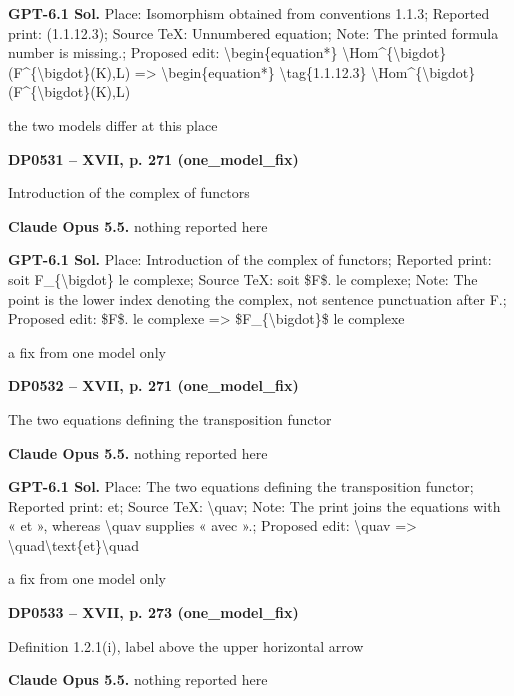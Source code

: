 \textbf{GPT-6.1 Sol.} Place: Isomorphism obtained from conventions 1.1.3; Reported print: (1.1.12.3); Source TeX: Unnumbered equation; Note: The printed formula number is missing.; Proposed edit: \textbackslash{}begin\{equation*\} \textbackslash{}Hom\textasciicircum{}\{\textbackslash{}bigdot\}(F\textasciicircum{}\{\textbackslash{}bigdot\}(K),L) =\allowbreak > \textbackslash{}begin\{equation*\} \textbackslash{}tag\{1.1.12.3\} \textbackslash{}Hom\textasciicircum{}\{\textbackslash{}bigdot\}(F\textasciicircum{}\{\textbackslash{}bigdot\}(K),L)\par
the two models differ at this place\par
\par\noindent\hypertarget{DP0531}{}\textbf{DP0531 -- XVII, p. 271 (one\_model\_fix)}\par
Introduction of the complex of functors\par
\textbf{Claude Opus 5.5.} nothing reported here\par
\textbf{GPT-6.1 Sol.} Place: Introduction of the complex of functors; Reported print: soit F\_\{\textbackslash{}bigdot\} le complexe; Source TeX: soit \$F\$. le complexe; Note: The point is the lower index denoting the complex, not sentence punctuation after F.; Proposed edit: \$F\$. le complexe =\allowbreak > \$F\_\{\textbackslash{}bigdot\}\$ le complexe\par
a fix from one model only\par
\par\noindent\hypertarget{DP0532}{}\textbf{DP0532 -- XVII, p. 271 (one\_model\_fix)}\par
The two equations defining the transposition functor\par
\textbf{Claude Opus 5.5.} nothing reported here\par
\textbf{GPT-6.1 Sol.} Place: The two equations defining the transposition functor; Reported print: et; Source TeX: \textbackslash{}quav; Note: The print joins the equations with « et », whereas \textbackslash{}quav supplies « avec ».; Proposed edit: \textbackslash{}quav =\allowbreak > \textbackslash{}quad\textbackslash{}text\{et\}\textbackslash{}quad\par
a fix from one model only\par
\par\noindent\hypertarget{DP0533}{}\textbf{DP0533 -- XVII, p. 273 (one\_model\_fix)}\par
Definition 1.2.1(i), label above the upper horizontal arrow\par
\textbf{Claude Opus 5.5.} nothing reported here\par
